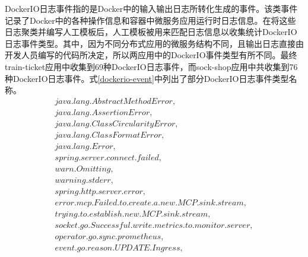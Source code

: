 DockerIO日志事件指的是Docker中的输入输出日志所转化生成的事件。该类事件记录了Docker\cite{boettiger2015introduction}中的各种操作信息和容器中微服务应用运行时日志信息。在将这些日志聚类并编写人工模板后，人工模板被用来匹配日志信息以收集统计DockerIO日志事件类型。其中，因为不同分布式应用的微服务结构不同，且输出日志直接由开发人员编写的代码所决定，所以两应用中的DockerIO事件类型有所不同。最终train-ticket应用中收集到69种DockerIO日志事件，而sock-shop应用中共收集到76种DockerIO日志事件。式\ref{dockerio-event}中列出了部分DockerIO日志事件类型名称。
\begin{equation}
    \begin{array}{l}
        java.lang.AbstractMethodError,\\
        java.lang.AssertionError,\\
        java.lang.ClassCircularityError,\\
        java.lang.ClassFormatError,\\
        java.lang.Error,\\
        spring.server.connect.failed,\\
        warn.Omitting,\\
        warning.stderr,\\
        spring.http.server.error,\\
        error.mcp.Failed.to.create.a.new.MCP.sink.stream,\\
        trying.to.establish.new.MCP.sink.stream,\\
        socket.go.Successful.write.metrics.to.monitor.server,\\
        operator.go.sync.prometheus,\\
        event.go.reason.UPDATE.Ingress,\\
    \end{array}
    \label{dockerio-event}
\end{equation}
